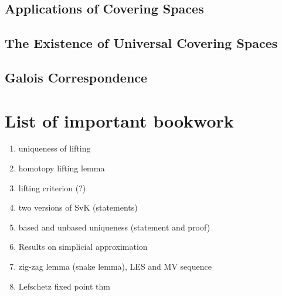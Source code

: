 \documentclass{article}
\theoremstyle{definition}
\theoremstyle{remark}
\theoremstyle{plain}
\begin{document}
\subsection{Applications of Covering Spaces}

\subsection{The Existence of Universal Covering Spaces}
\subsection{Galois Correspondence}

\section{List of important bookwork}
\begin{enumerate}
    \item uniqueness of lifting
    \item homotopy lifting lemma
    \item lifting criterion (?)
    \item two versions of SvK (statements)
    \item based and unbased uniqueness (statement and proof)
    \item Results on simplicial approximation
    \item zig-zag lemma (snake lemma), LES and MV sequence
    \item Lefschetz fixed point thm
\end{enumerate}
\end{document}
